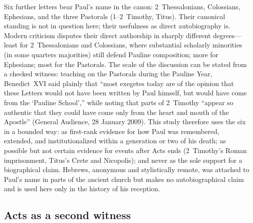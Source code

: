 Six further letters bear Paul's name in the canon: 2~Thessalonians,
Colossians, Ephesians, and the three Pastorals (1--2~Timothy, Titus). Their
canonical standing is not in question here; their usefulness as direct
autobiography is. Modern criticism disputes their direct authorship in
sharply different degrees---least for 2~Thessalonians and Colossians, where
substantial scholarly minorities (in some quarters majorities) still defend
Pauline composition; more for Ephesians; most for the Pastorals. The
scale of the discussion can be stated from a checked witness: teaching on
the Pastorals during the Pauline Year, Benedict~XVI said plainly that
``most exegetes today are of the opinion that these Letters would not have
been written by Paul himself, but would have come from the `Pauline
School','' while noting that parts of 2~Timothy ``appear so authentic that
they could have come only from the heart and mouth of the Apostle''
(General Audience, 28 January 2009). This study therefore uses the six in a
bounded way: as first-rank evidence for how Paul was remembered, extended,
and institutionalized within a generation or two of his death; as possible
but not certain evidence for events after Acts ends (2~Timothy's Roman
imprisonment, Titus's Crete and Nicopolis); and never as the sole support
for a biographical claim. Hebrews, anonymous and stylistically remote, was
attached to Paul's name in parts of the ancient church but makes no
autobiographical claim and is used here only in the history of his
reception.


\subsection{Acts as a second witness}


